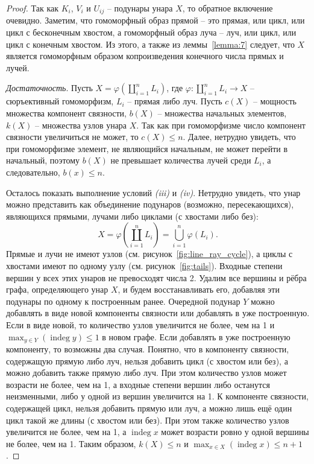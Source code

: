 \documentclass[11pt,twoside,final
]{article}
\def\indeg{\operatorname{indeg}}
\begin{document}
\begin{proof}
	Так как $K_i$, $V_i$ и $U_{ij}$ -- подунары унара $X$, то обратное включение очевидно.
	Заметим, что гомоморфный образ прямой -- это прямая, или цикл, или цикл с бесконечным хвостом, а гомоморфный образ луча -- луч, или цикл, или цикл с конечным хвостом.
	Из этого, а также из леммы~\ref{lemma:7} следует, что $X$ является гомоморфным образом копроизведения конечного числа прямых и лучей.

	\textit{Достаточность}.
	Пусть $X = \varphi(\coprod_{i = 1}^{n} L_i)$, где $\varphi: \coprod_{i = 1}^{n} L_i \rightarrow X$ -- сюръективный гомоморфизм, $L_i$ -- прямая либо луч.
	Пусть $c(X)$ -- мощность множества компонент связности, $b(X)$ -- множества начальных элементов, $k(X)$ -- множества узлов унара $X$.
	Так как при гомоморфизме число компонент связности увеличиться не может, то $c(X) \leqslant n$.
	Далее, нетрудно увидеть, что при гомоморфизме элемент, не являющийся начальным, не может перейти в начальный, поэтому $b(X)$ не превышает количества лучей среди $L_i$, а следовательно, $b(x) \leqslant n$.

	Осталось показать выполнение условий \textit{(iii)} и \textit{(iv)}.
	Нетрудно увидеть, что унар можно представить как объединение подунаров (возможно, пересекающихся), являющихся прямыми, лучами либо циклами (с хвостами либо без):
	\[
		X = \varphi(\coprod_{i = 1}^n L_i) = \bigcup_{i = 1}^n \varphi(L_i).
	\]
	Прямые и лучи не имеют узлов (см. рисунок~\ref{fig:line_ray_cycle}), а циклы с хвостами имеют по одному узлу (см. рисунок~\ref{fig:tails}).
	Входные степени вершин у всех этих унаров не превосходят числа 2.
	Удалим все вершины и рёбра графа, определяющего унар $X$, и будем восстанавливать его, добавляя эти подунары по одному к построенным ранее.
	Очередной подунар $Y$ можно добавлять в виде новой компоненты связности или добавлять в уже построенную.
	Если в виде новой, то количество узлов увеличится не более, чем на 1 и $\max_{y \in Y} (\indeg y) \leqslant 1$ в новом графе.
	Если добавлять в уже построенную компоненту, то возможны два случая.
	Понятно, что в компоненту связности, содержащую прямую либо луч, нельзя добавить цикл (с хвостом или без), а можно добавить также прямую либо луч.
	При этом количество узлов может возрасти не более, чем на 1, а входные степени вершин либо останутся неизменными, либо у одной из вершин увеличится на 1.
	К компоненте связности, содержащей цикл, нельзя добавить прямую или луч, а можно лишь ещё один цикл такой же длины (с хвостом или без).
	При этом также количество узлов увеличится не более, чем на 1, а $\indeg x$ может возрасти ровно у одной вершины не более, чем на 1.
	Таким образом, $k(X) \leqslant n$ и $\max_{x \in X} (\indeg x) \leqslant  n + 1$.
\end{proof}
\end{document}

